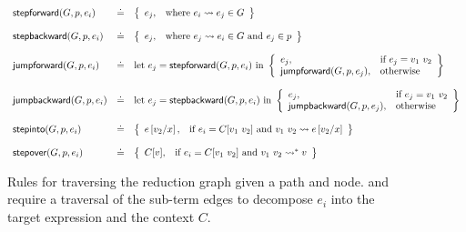 \begin{figure}[t]
\centering
\[
\begin{array}{lcl}
\stepforward{G}{p}{e_i}  &\defeq& \left\{\begin{array}{ll}
    e_j, & \text{where } \singlestep{e_i}{e_j} \in G
                         \end{array}\right\} \\ \\
\stepbackward{G}{p}{e_i}  &\defeq& \left\{\begin{array}{ll}
    e_j, & \text{where } \singlestep{e_j}{e_i} \in G \text{ and } e_j \in p
                         \end{array}\right\} \\ \\
\jumpforward{G}{p}{e_i} &\defeq& \text{let } e_j = \stepforward{G}{p}{e_i} \text{ in }
                         \left\{\begin{array}{ll}
                         e_j, & \text{if } e_j = \eapp{v_1}{v_2} \\
                         \jumpforward{G}{p}{e_{j}}, & \text{otherwise}
                         \end{array}\right\} \\ \\
\jumpbackward{G}{p}{e_i} &\defeq& \text{let } e_j = \stepbackward{G}{p}{e_i} \text{ in }
                         \left\{\begin{array}{ll}
                         e_j, & \text{if } e_j = \eapp{v_1}{v_2} \\
                         \jumpbackward{G}{p}{e_{j}}, & \text{otherwise}
                         \end{array}\right\} \\ \\
\stepinto{G}{p}{e_i} &\defeq& \left\{\begin{array}{ll}
                         e\sub{x}{v_2}, & \text{if } e_i = C[\eapp{v_1}{v_2}] \text{ and } \singlestep{\eapp{v_1}{v_2}}{e\sub{x}{v_2}}
                         \end{array}\right\} \\ \\
\stepover{G}{p}{e_i} &\defeq& \left\{\begin{array}{ll}
                         C[v], & \text{if } e_i = C[\eapp{v_1}{v_2}] \text{ and } \multistep{\eapp{v_1}{v_2}}{v}
                         \end{array}\right\}
\end{array}
\]
\caption{Rules for traversing the reduction graph given a path and
  node. \stepintosym and \stepoversym require a traversal of the
  sub-term edges to decompose $e_i$ into the target expression
   and the context $C$.   }
\label{fig:traversing-graph}
\end{figure}


